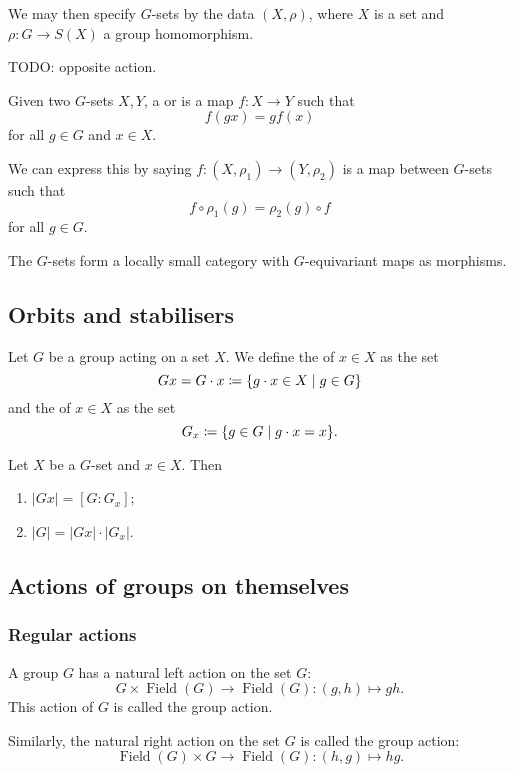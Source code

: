We may then specify $G$-sets by the data $(X,\rho)$, where $X$ is a set and $\rho: G \to S(X)$ a group homomorphism.

TODO: opposite action.

\begin{definition}
Given two $G$-sets $X,Y$, a  or  is a map $f:X \to Y$ such that
\[ f(gx) = gf(x) \]
for all $g\in G$ and $x\in X$.
\end{definition}
We can express this by saying $f: (X,\rho_1) \to (Y,\rho_2)$ is a map between $G$-sets such that
\[ f\circ \rho_1(g) = \rho_2(g)\circ f \]
for all $g\in G$.

\begin{lemma}
The $G$-sets form a locally small category with $G$-equivariant maps as morphisms.
\end{lemma}


\subsection{Orbits and stabilisers}
\begin{definition}
Let $G$ be a group acting on a set $X$. We define the  of $x\in X$ as the set
\[ Gx = G\cdot x \defeq \setbuilder{g\cdot x \in X}{g\in G}  \]
and the  of $x\in X$ as the set
\[ G_x \defeq \setbuilder{g\in G}{g\cdot x = x}. \]
\end{definition}
\begin{proposition}
Let $X$ be a $G$-set and $x\in X$. Then
\begin{enumerate}
\item $|Gx| = [G:G_x]$;
\item $|G| = |Gx|\cdot |G_x|$.
\end{enumerate}
\end{proposition}

\subsection{Actions of groups on themselves}
\subsubsection{Regular actions}
\begin{definition}
A group $G$ has a natural left action on the set $G$:
\[ G\times \operatorname{Field}(G) \to \operatorname{Field}(G): (g,h) \mapsto gh. \]
This action of $G$ is called the  group action.

Similarly, the natural right action on the set $G$ is called the  group action:
\[ \operatorname{Field}(G) \times G \to \operatorname{Field}(G): (h,g) \mapsto hg. \]
\end{definition}

